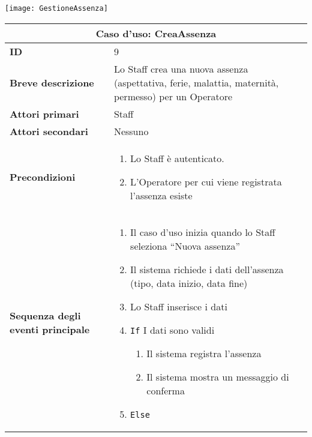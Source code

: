\documentclass[a4paper]{report}
\begin{document}
\begin{figure*}[ht]
    \centering
    \texttt{[image: GestioneAssenza]}
\end{figure*}

\clearpage
\renewcommand{\arraystretch}{1.9}
\begin{table}[H]
\vspace*{-0cm}
\begin{tabular}{|p{3.9cm}|p{9.9cm}|}
\hline
\multicolumn{2}{|c|}{\textbf{Caso d’uso: CreaAssenza}} \\ \hline
\textbf{ID} & 9 \\ \hline
\textbf{Breve descrizione} & Lo Staff crea una nuova assenza (aspettativa, ferie, malattia, maternità, permesso) per un Operatore \\ \hline
\textbf{Attori primari} & Staff \\ \hline
\textbf{Attori secondari} & Nessuno \\ \hline
\textbf{Precondizioni} & \begin{enumerate}[leftmargin=14pt,label=\arabic*.,labelsep=0.5em,topsep=0pt,partopsep=0pt,parsep=0pt,itemsep=0pt]
    \item Lo Staff è autenticato.
    \item L’Operatore per cui viene registrata l’assenza esiste
\end{enumerate} \\ \hline
\textbf{Sequenza degli eventi principale} & \begin{enumerate}[leftmargin=14pt,label=\arabic*.,labelsep=0.5em,topsep=0pt,partopsep=0pt,parsep=0pt,itemsep=0pt]
    \item Il caso d’uso inizia quando lo Staff seleziona “Nuova assenza”
    \item Il sistema richiede i dati dell’assenza (tipo, data inizio, data fine)
    \item Lo Staff inserisce i dati
    \item \texttt{If} I dati sono validi
    \begin{enumerate}[label=\arabic{enumi}.\arabic*.,leftmargin=22pt,labelsep=0.5em,topsep=0pt,partopsep=0pt,parsep=0pt,itemsep=0pt]
        \item Il sistema registra l’assenza
        \item Il sistema mostra un messaggio di conferma
    \end{enumerate}
    \item \texttt{Else}
    \begin{enumerate}[label=\arabic{enumi}.\arabic*.,leftmargin=22pt,labelsep=0.5em,topsep=0pt,partopsep=0pt,parsep=0pt,itemsep=0pt]

\end{enumerate}
\end{enumerate}
\end{tabular}
\end{table}
\end{document}

